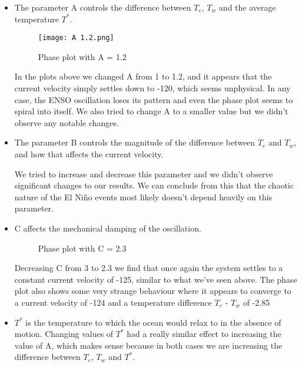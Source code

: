 \documentclass{article}
\begin{document}
\begin{itemize}

\item The parameter A controls the difference between $T_e$, $T_w$ and the average temperature $T^*$.

\begin{figure}[h]
\centering
\texttt{[image: A 1.2.png]}
\caption{\label{fig:Diagram}{Phase plot with A = 1.2}}
\end{figure}

In the plots above we changed A from 1 to 1.2, and it appears that the current velocity simply settles down to -120, which seems unphysical. In any case, the ENSO oscillation loses its pattern and even the phase plot seems to spiral into itself. We also tried to change A to a smaller value but we didn’t observe any notable changes.

\item The parameter B controls the magnitude of the difference between $T_e$ and $T_w$, and how that affects the current velocity. 

We tried to increase and decrease this parameter and we didn’t observe significant changes to our results. We can conclude from this that the chaotic nature of the El Niño events most likely doesn’t depend heavily on this parameter. 


\item C affects the mechanical damping of the oscillation.

\begin{figure}[h]
    \centering
    \qquad
    \caption{Phase plot with C = 2.3}%
    \label{fig:example}%
\end{figure}

Decreasing C from 3 to 2.3 we find that once again the system settles to a constant current velocity of -125, similar to what we’ve seen above. The phase plot also shows some very strange behaviour where it appears to converge to a current velocity of -124 and a temperature difference $T_e$ - $T_w$ of -2.85 

\item $T^*$ is the temperature to which the ocean would relax to in the absence of motion. Changing values of $T^*$ had a really similar effect to increasing the value of A, which makes sense because in both cases we are increasing the difference between $T_e$, $T_w$ and $T^*$. 


\end{itemize}
\end{document}
